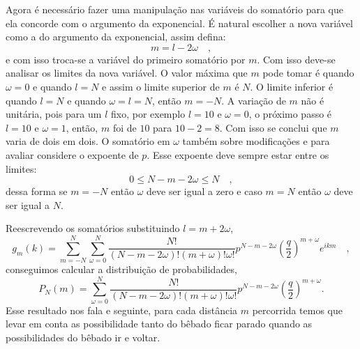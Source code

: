 \documentclass[12pt]{article}
\begin{document}
Agora é necessário fazer uma manipulação nas variáveis do somatório para que ela concorde com o argumento da exponencial. É natural escolher a nova variável como a do argumento da exponencial, assim defina:
\begin{equation}
m = l - 2\omega \quad,
\end{equation}
e com isso troca-se a variável do primeiro somatório por $m$. Com isso deve-se analisar os limites da nova variável. O valor máxima que $m$ pode tomar é quando $\omega=0$ e quando $l=N$ e assim o limite superior de $m$ é $N$. O limite inferior é quando $l=N$ e quando $\omega = l = N$, então $m=-N$. A variação de $m$ não é unitária, pois para um $l$ fixo, por exemplo $l=10$ e $\omega=0$, o próximo passo é $l=10$ e $\omega=1$, então, $m$ foi de $10$ para $10-2=8$. Com isso se conclui que $m$ varia de dois em dois. O somatório em $\omega$ também sobre modificações e para avaliar considere o expoente de $p$. Esse expoente deve sempre estar entre os limites:
\begin{equation}
0 \leq N-m-2\omega \leq N \quad,
\end{equation}
dessa forma se $m=-N$ então $\omega$ deve ser igual a zero e caso $m=N$ então $\omega$ deve ser igual a $N$.

Reescrevendo os somatórios substituindo $l=m+2\omega$,
\begin{equation}
g_m(k) = \sum\limits_{m=-N}^N \sum\limits_{\omega=0}^N \frac{N!}{(N-m-2\omega)!(m + \omega)!\omega !} p^{N-m-2\omega} \left(\frac{q}{2}\right)^{m+\omega}e^{ikm} \quad,
\end{equation}
conseguimos calcular a distribuição de probabilidades, 
\begin{equation}
P_N(m) = \sum\limits_{\omega=0}^N \frac{N!}{(N-m-2\omega)!(m + \omega)!\omega !} p^{N-m-2\omega} \left(\frac{q}{2}\right)^{m+\omega}.
\end{equation}
Esse resultado nos fala e seguinte, para cada distância $m$ percorrida temos que levar em conta as possibilidade tanto do bêbado ficar parado quando as possibilidades do bêbado ir e voltar. 
\end{document}
